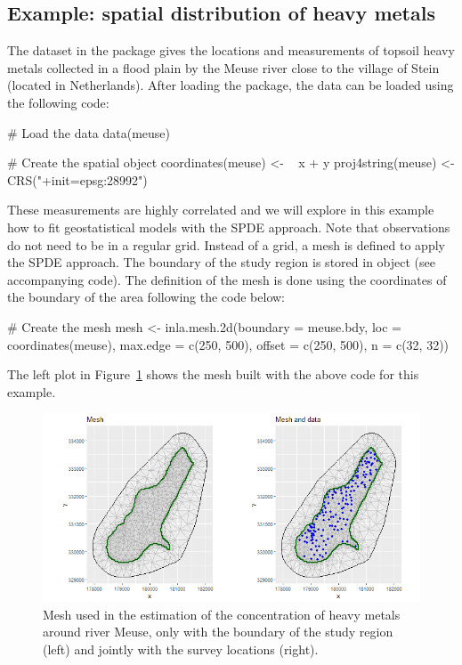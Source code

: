 \subsection{Example: spatial distribution of heavy metals}

The  dataset in the  package gives the locations and measurements of topsoil heavy metals collected in a flood plain by the Meuse river close to the village of Stein (located in Netherlands). After loading the  package, the data can be loaded using the following code:

\begin{example*}
# Load the data
data(meuse)

# Create the spatial object
coordinates(meuse) <- ~ x + y
proj4string(meuse) <- CRS("+init=epsg:28992")
\end{example*}

These measurements are highly correlated and we will explore in this example how to fit geostatistical models with the SPDE approach. Note that observations do not need to be in a regular grid. Instead of a grid, a mesh is defined to apply the SPDE approach. The boundary of the study region is stored in object  (see accompanying code). The definition of the mesh is done using the coordinates of the boundary of the area following the code below:

\begin{example*}
# Create the mesh
mesh <- inla.mesh.2d(boundary = meuse.bdy, loc = coordinates(meuse),
  max.edge = c(250, 500), offset = c(250, 500), n = c(32, 32))
\end{example*}

\noindent
The left plot in Figure~\ref{fig:meuse:mesh} shows the mesh built with the above code for this example.



\begin{figure}[h!]
\begin{center}
\includegraphics[scale=0.5]{images/meuse_Only2_mesh.png}
\end{center}
\caption{Mesh used in the estimation of the concentration of heavy metals around river Meuse, only with the boundary of the study region (left) and jointly with the survey locations (right).}
\label{fig:meuse:mesh}
\end{figure}

